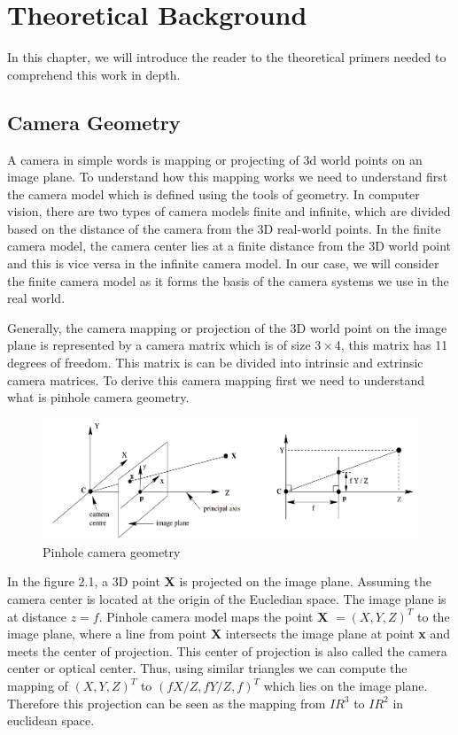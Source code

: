 

    \chapter{Theoretical Background}
    In this chapter, we will introduce the reader to the theoretical primers needed to comprehend this work in depth. 

    \section{Camera Geometry}
    A camera in simple words is mapping or projecting of 3d world points on an image plane. To understand how this mapping works we need to understand first the camera model which is defined using the tools of geometry. In computer vision, there are two types of camera models finite and infinite, which are divided based on the distance of the camera from the 3D real-world points. In the finite camera model, the camera center lies at a finite distance from the 3D world point and this is vice versa in the infinite camera model. In our case, we will consider the finite camera model as it forms the basis of the camera systems we use in the real world. 
    
    Generally, the camera mapping or projection of the 3D world point on the image plane is represented by a camera matrix which is of size $3 \times 4$, this matrix has 11 degrees of freedom. This matrix is can be divided into intrinsic and extrinsic camera matrices. To derive this camera mapping first we need to understand what is pinhole camera geometry. 
    
     \begin{figure}[h]
    \centering
    \includegraphics[width=\textwidth]{images/pinhole_camera.png}
    \caption{Pinhole camera geometry \cite{10.5555/861369}}
    \end{figure}
    
    In the figure 2.1, a 3D point \textbf{X} is projected on the image plane. Assuming the camera center is located at the origin of the Eucledian space. The image plane is at distance $z = f$. Pinhole camera model maps the point  \textbf{X} $ = (X, Y, Z)^{T}$ to the image plane, where a line from point \textbf{X} intersects the image plane at point \textbf{x} and meets the center of projection. This center of projection is also called the camera center or optical center. Thus, using similar triangles we can compute the mapping of $ (X, Y, Z)^{T}$ to $(fX/Z, fY/Z, f)^{T}$ which lies on the image plane. Therefore this projection can be seen as the mapping from $IR^{3}$ to $IR^{2}$ in euclidean space.  
    
